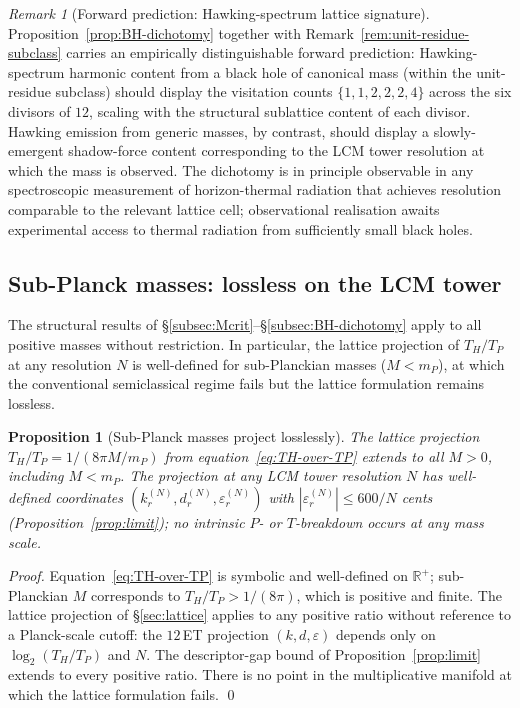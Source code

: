 \documentclass[11pt,a4paper]{article}
\newtheorem{proposition}[theorem]{Proposition}
\theoremstyle{definition}
\theoremstyle{remark}
\newtheorem{remark}[theorem]{Remark}
\begin{document}
\begin{remark}[Forward prediction: Hawking-spectrum lattice signature]\label{rem:BH-prediction}
Proposition~\ref{prop:BH-dichotomy} together with Remark~\ref{rem:unit-residue-subclass} carries an empirically distinguishable forward prediction: Hawking-spectrum harmonic content from a black hole of canonical mass (within the unit-residue subclass) should display the visitation counts $\{1,1,2,2,2,4\}$ across the six divisors of $12$, scaling with the structural sublattice content of each divisor. Hawking emission from generic masses, by contrast, should display a slowly-emergent shadow-force content corresponding to the LCM tower resolution at which the mass is observed. The dichotomy is in principle observable in any spectroscopic measurement of horizon-thermal radiation that achieves resolution comparable to the relevant lattice cell; observational realisation awaits experimental access to thermal radiation from sufficiently small black holes.
\end{remark}

\subsection{Sub-Planck masses: lossless on the LCM tower}\label{subsec:subplanck}

The structural results of \S\ref{subsec:Mcrit}--\S\ref{subsec:BH-dichotomy} apply to all positive masses without restriction. In particular, the lattice projection of $T_{H}/T_{P}$ at any resolution $N$ is well-defined for sub-Planckian masses ($M < m_{P}$), at which the conventional semiclassical regime fails but the lattice formulation remains lossless.

\begin{proposition}[Sub-Planck masses project losslessly]\label{prop:subplanck-lossless}
The lattice projection $T_{H}/T_{P} = 1/(8\pi M/m_{P})$ from equation~\eqref{eq:TH-over-TP} extends to all $M > 0$, including $M < m_{P}$. The projection at any LCM tower resolution $N$ has well-defined coordinates $(k_{r}^{(N)}, d_{r}^{(N)}, \varepsilon_{r}^{(N)})$ with $|\varepsilon_{r}^{(N)}| \le 600/N$ cents (Proposition~\ref{prop:limit}); no intrinsic $P$- or $T$-breakdown occurs at any mass scale.
\end{proposition}

\begin{proof}
Equation~\eqref{eq:TH-over-TP} is symbolic and well-defined on $\mathbb{R}^{+}$; sub-Planckian $M$ corresponds to $T_{H}/T_{P} > 1/(8\pi)$, which is positive and finite. The lattice projection of \S\ref{sec:lattice} applies to any positive ratio without reference to a Planck-scale cutoff: the $12$\,ET projection $(k,d,\varepsilon)$ depends only on $\log_{2}(T_{H}/T_{P})$ and $N$. The descriptor-gap bound of Proposition~\ref{prop:limit} extends to every positive ratio. There is no point in the multiplicative manifold at which the lattice formulation fails. \qed
\end{proof}
\end{document}
